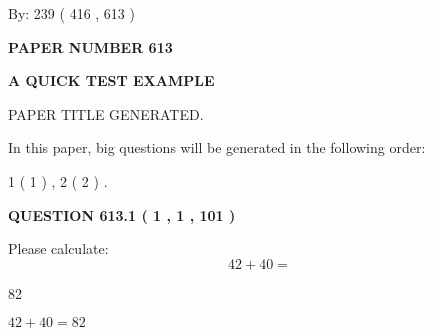 \documentclass[12pt]{article}
\begin{document}
   
\hspace{1.0in} By: 
 239 ( 416 ,  613 )
   
   
   
   
\newpage 
\setcounter{page}{ 
   613001 } 
   
   
   
   
 {\textbf{ \Large{ PAPER NUMBER  613  }}}
   
   
\vspace{0.2in}
   
   
   
   
   
   
   
   
 \vspace{0.2in}
{\LARGE {\textbf{ A QUICK TEST EXAMPLE}}}
   
   
 PAPER TITLE GENERATED.
   
   
   
\vspace{0.2in}
   
In this paper, big questions will be generated in the following order: 
   
   
   1 ( 1 )
 ,
   2 ( 2 )
 .
  
\vspace{0.2in}
  
{\textbf{\Large{QUESTION
613.1 
 ( 1 , 1 , 101 )
}}}
  
  
 
Please calculate:
\begin{equation}
42 +  %
40 = \nonumber
\end{equation}
 
 
 
\noindent{}
 
 

82
 
 
\noindent{}
 
 

 
 
 
\noindent{}
 
 

$ %
42 +  %
40=   %
82$
 
 
\noindent{}
 
\end{document}
